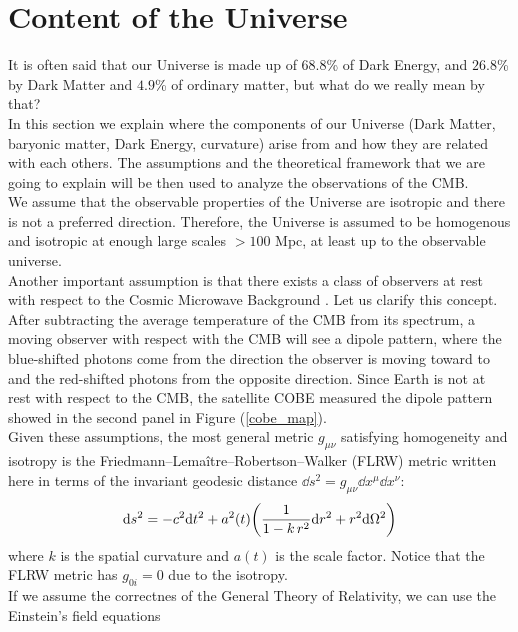 \documentclass{article}
\begin{document}
\newpage


\section{Content of the Universe} 
It is often said that our Universe is made up of $68.8$\% of Dark Energy, and $26.8 $\% by Dark Matter and $4.9 $\% of ordinary matter, but what do we really mean by that?\\
In this section we explain where the components of our Universe (Dark Matter, baryonic matter, Dark Energy, curvature)  arise from and how they are related with each others. 
The assumptions and the theoretical framework that we are going to explain will be then used to analyze the observations of the CMB.\\
We assume that the observable properties of the Universe are isotropic and there is not a preferred direction. 
Therefore, the Universe is assumed to be homogenous and isotropic at enough large scales $> 100$ Mpc, at least up to the observable universe.\\
Another important assumption is that there exists a class of observers at rest with respect to the Cosmic Microwave Background \citep{bartelmannStandardModelCosmology}.
Let us clarify this concept. 
After subtracting the average temperature of the CMB from its spectrum, a moving observer with respect with the CMB will see a dipole pattern, where the blue-shifted photons come from the direction the observer is moving toward to and the red-shifted photons from the opposite direction.
Since Earth is not at rest with respect to the CMB, the satellite COBE measured the dipole pattern showed in the second panel in Figure (\ref{cobe_map}).\\
Given these assumptions, the most general metric $g_{\mu \nu}$ satisfying homogeneity and isotropy is the Friedmann–Lemaître–Robertson–Walker (FLRW) metric written here in terms of the invariant geodesic distance $\dd s ^2 = g_{\mu \nu} \dd x^{\mu} \dd x^{\nu}$:
\begin{equation}
\label{metric}
\dd s ^2 = -c ^2 \dd t^2 + a^2 (t) \qty( \frac{1}{1-k \, r^2} \dd r^2 + r^2 \dd \Omega ^2 )  
\end{equation}
where $k$ is the spatial curvature and $a(t)$ is the scale factor.
Notice that the FLRW metric has $g_{0 i}=0$ due to the isotropy.
\\ %
If we assume the correctnes of the General Theory of Relativity, we can use the Einstein's field equations
\end{document}
